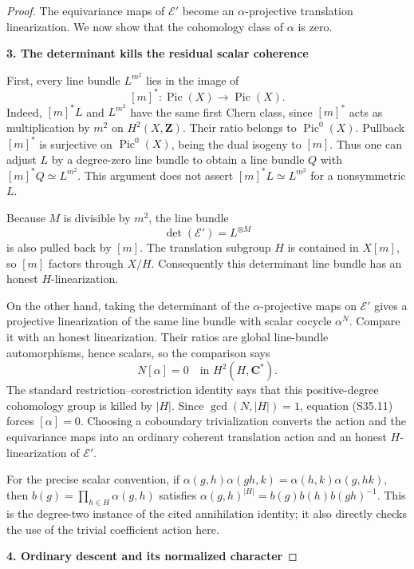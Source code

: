 \documentclass[11pt,a4paper]{article}
\theoremstyle{definition}
\begin{document}
\begin{proof}
The equivariance maps of \(\mathcal E'\) become an \(\alpha\)-projective translation linearization. We now show that the cohomology class of \(\alpha\) is zero.

\par\medskip\noindent\textbf{3. The determinant kills the residual scalar coherence}\quad

First, every line bundle \(L^{m^2}\) lies in the image of \[
 [m]^*:\operatorname{Pic}(X)\longrightarrow\operatorname{Pic}(X).
 \tag{S35.10}
\] Indeed, \([m]^*L\) and \(L^{m^2}\) have the same first Chern class, since \([m]^*\) acts as multiplication by \(m^2\) on \(H^2(X,\mathbf Z)\). Their ratio belongs to \(\operatorname{Pic}^0(X)\). Pullback \([m]^*\) is surjective on \(\operatorname{Pic}^0(X)\), being the dual isogeny to \([m]\). Thus one can adjust \(L\) by a degree-zero line bundle to obtain a line bundle \(Q\) with \([m]^*Q\simeq L^{m^2}\). This argument does not assert \([m]^*L\simeq L^{m^2}\) for a nonsymmetric \(L\).

Because \(M\) is divisible by \(m^2\), the line bundle \[
 \det(\mathcal E')=L^{\otimes M}
\] is also pulled back by \([m]\). The translation subgroup \(H\) is contained in \(X[m]\), so \([m]\) factors through \(X/H\). Consequently this determinant line bundle has an honest \(H\)-linearization.

On the other hand, taking the determinant of the \(\alpha\)-projective maps on \(\mathcal E'\) gives a projective linearization of the same line bundle with scalar cocycle \(\alpha^N\). Compare it with an honest linearization. Their ratios are global line-bundle automorphisms, hence scalars, so the comparison says \[
 N[\alpha]=0\quad\text{in }H^2(H,\mathbf C^*).
 \tag{S35.11}
\] The standard restriction--corestriction identity says that this positive-degree cohomology group is killed by \(|H|\). Since \(\gcd(N,|H|)=1\), equation (S35.11) forces \([\alpha]=0\). Choosing a coboundary trivialization converts the action and the equivariance maps into an ordinary coherent translation action and an honest \(H\)-linearization of \(\mathcal E'\).

For the precise scalar convention, if \(\alpha(g,h)\alpha(gh,k)=\alpha(h,k)\alpha(g,hk)\), then \(b(g)=\prod_{h\in H}\alpha(g,h)\) satisfies \(\alpha(g,h)^{|H|}=b(g)b(h)b(gh)^{-1}\). This is the degree-two instance of the cited annihilation identity; it also directly checks the use of the trivial coefficient action here.

\par\medskip\noindent\textbf{4. Ordinary descent and its normalized character}\quad


\end{proof}
\end{document}
